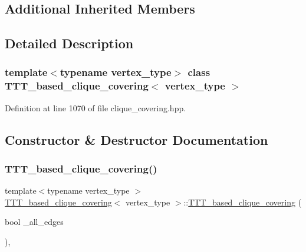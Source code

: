 \subsection*{Additional Inherited Members}


\subsection{Detailed Description}
\subsubsection*{template$<$typename vertex\+\_\+type$>$\newline
class T\+T\+T\+\_\+based\+\_\+clique\+\_\+covering$<$ vertex\+\_\+type $>$}



Definition at line 1070 of file clique\+\_\+covering.\+hpp.



\subsection{Constructor \& Destructor Documentation}
\mbox{\label{classTTT__based__clique__covering_a2f1d71a79e381dfd9f66fddc8408d51d}} 
\subsubsection{\texorpdfstring{T\+T\+T\+\_\+based\+\_\+clique\+\_\+covering()}{TTT\_based\_clique\_covering()}}
{\footnotesize\ttfamily template$<$typename vertex\+\_\+type $>$ \\
\hyperlink{classTTT__based__clique__covering}{T\+T\+T\+\_\+based\+\_\+clique\+\_\+covering}$<$ vertex\+\_\+type $>$\+::\hyperlink{classTTT__based__clique__covering}{T\+T\+T\+\_\+based\+\_\+clique\+\_\+covering} (\begin{DoxyParamCaption}\item[{bool}]{\+\_\+all\+\_\+edges }\end{DoxyParamCaption})\hspace{0.3cm}{\ttfamily [inline]}, {\ttfamily [explicit]}}



